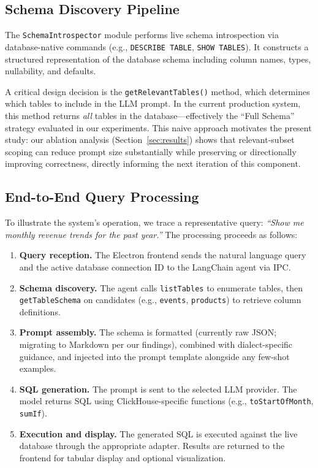 \documentclass[sigconf, nonacm]{acmart}
\begin{document}
\subsection{Schema Discovery Pipeline}
The \texttt{SchemaIntrospector} module performs live schema introspection via database-native commands (e.g., \texttt{DESCRIBE TABLE}, \texttt{SHOW TABLES}). It constructs a structured representation of the database schema including column names, types, nullability, and defaults.

A critical design decision is the \texttt{getRelevantTables()} method, which determines which tables to include in the LLM prompt. In the current production system, this method returns \emph{all} tables in the database---effectively the ``Full Schema'' strategy evaluated in our experiments. This naive approach motivates the present study: our ablation analysis (Section~\ref{sec:results}) shows that relevant-subset scoping can reduce prompt size substantially while preserving or directionally improving correctness, directly informing the next iteration of this component.

\subsection{End-to-End Query Processing}
\label{sec:e2e}
To illustrate the system's operation, we trace a representative query: \emph{``Show me monthly revenue trends for the past year.''} The processing proceeds as follows:

\begin{enumerate}
    \item \textbf{Query reception.} The Electron frontend sends the natural language query and the active database connection ID to the LangChain agent via IPC.
    \item \textbf{Schema discovery.} The agent calls \texttt{listTables} to enumerate tables, then \texttt{getTableSchema} on candidates (e.g., \texttt{events}, \texttt{products}) to retrieve column definitions.
    \item \textbf{Prompt assembly.} The schema is formatted (currently raw JSON; migrating to Markdown per our findings), combined with dialect-specific guidance, and injected into the prompt template alongside any few-shot examples.
    \item \textbf{SQL generation.} The prompt is sent to the selected LLM provider. The model returns SQL using ClickHouse-specific functions (e.g., \texttt{toStartOfMonth}, \texttt{sumIf}).
    \item \textbf{Execution and display.} The generated SQL is executed against the live database through the appropriate adapter. Results are returned to the frontend for tabular display and optional visualization.
\end{enumerate}
\end{document}
